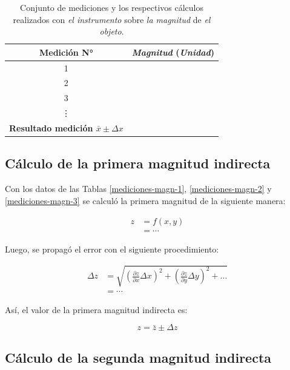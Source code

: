 \documentclass[12pt,a4paper]{article}
\begin{document}
\begin{table}[h!]
\centering
\begin{tabular}{|c|c|}
\hline
\textbf{Medición N°} & \textit{Magnitud} \textbf{(}\textit{Unidad}\textbf{)} \\ \hline
1 & \\ \hline
2 & \\ \hline
3 & \\ \hline
\vdots & \\ \hline
\textbf{Resultado medición $\bar{x} \pm \Delta x$} & \\ \hline
\end{tabular}
\caption{Conjunto de mediciones y los respectivos cálculos realizados con \textit{el instrumento} sobre \textit{la magnitud} de \textit{el objeto}.}
\label{mediciones-magn-4}
\end{table}

\newpage

\subsection{Cálculo de la primera magnitud indirecta}

Con los datos de las Tablas \ref{mediciones-magn-1}, \ref{mediciones-magn-2} y \ref{mediciones-magn-3} se calculó la primera magnitud de la siguiente manera:

\begin{align*}
    z &= f(x,y) \\
     &= \cdots
\end{align*}

Luego, se propagó el error con el siguiente procedimiento:

\begin{align*}
    \Delta z &= \sqrt{ \left( \frac{\partial z}{\partial x} \Delta x \right)^2 + \left( \frac{\partial z}{\partial y} \Delta y \right)^2 + \dots } \\
     &= \cdots
\end{align*}

Así, el valor de la primera magnitud indirecta es:

\begin{equation*}
    z = \bar{z} \pm \Delta z
\end{equation*}

\subsection{Cálculo de la segunda magnitud indirecta}
\end{document}
